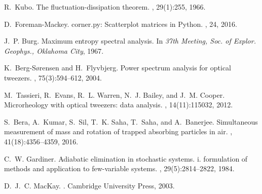 \documentclass[english,aps, twocolumn, pre,superscriptaddress, notitlepage]{revtex4-1}
\begin{document}
\begin{thebibliography}{10}
R.~Kubo.
\newblock The fluctuation-dissipation theorem.
, 29(1):255, 1966.

D.~Foreman-Mackey.
\newblock corner.py: Scatterplot matrices in {P}ython.
, 24, 2016.

J.~P. Burg.
\newblock Maximum entropy spectral analysis.
\newblock In {\em 37th Meeting, Soc. of Explor. Geophys., Oklahoma City}, 1967.

K.~Berg-S{\o}rensen and H.~Flyvbjerg.
\newblock Power spectrum analysis for optical tweezers.
, 75(3):594--612, 2004.

M.~Tassieri, R.~Evans, R.~L. Warren, N.~J. Bailey, and J.~M. Cooper.
\newblock Microrheology with optical tweezers: data analysis.
, 14(11):115032, 2012.

S.~Bera, A.~Kumar, S.~Sil, T.~K. Saha, T.~Saha, and A.~Banerjee.
\newblock Simultaneous measurement of mass and rotation of trapped absorbing
  particles in air.
, 41(18):4356--4359, 2016.

C.~W. Gardiner.
\newblock Adiabatic elimination in stochastic systems. i. formulation of
  methods and application to few-variable systems.
, 29(5):2814--2822, 1984.

D.~J.~C. MacKay.
.
\newblock Cambridge University Press, 2003.

\end{thebibliography}
\end{document}
